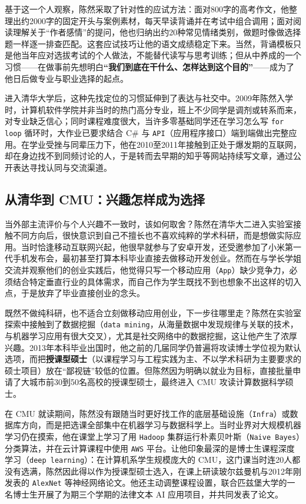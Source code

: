 \documentclass[UTF8,a4paper,11pt,fontset=fandol]{ctexart}
\begin{document}
基于这一个人观察，陈然采取了针对性的应试方法：面对800字的高考作文，他整理出约2000字的固定开头与案例素材，每天早读背诵并在考试中组合调用；面对阅读理解关于“作者感情”的提问，他也归纳出约20种常见情绪类别，做题时像做选择题一样逐一排查匹配。这套应试技巧让他的语文成绩稳定下来。当然，背诵模板只是他当年应对选拔考试的个人做法，不能替代读写与思考训练；但从中养成的一个习惯——在做事前先想明白\textbf{“我们到底在干什么、怎样达到这个目的”}——成为了他日后做专业与职业选择的起点。

进入清华大学后，这种先找定位的习惯延伸到了表达与社交中。2009年陈然入学时，计算机软件学院并非当时的热门高分专业，班上不少同学是调剂或转系而来，对专业缺乏信心；同时课程难度很大，当许多零基础同学还在学习怎么写 \texttt{for loop} 循环时，大作业已要求结合 C\# 与 \texttt{API}（应用程序接口）端到端做出完整应用。在学业受挫与同辈压力下，他在2010至2011年接触到正处于爆发期的互联网，却在身边找不到同频讨论的人，于是转而去早期的知乎等网站持续写文章，通过公开表达寻找认同与交流渠道。

\subsection{从清华到 CMU：兴趣怎样成为选择}
当外部主流评价与个人兴趣不一致时，该如何取舍？陈然在清华大二进入实验室接触不同方向后，很快意识到自己不擅长也不喜欢纯粹的学术科研，而是想做实际应用。当时恰逢移动互联网兴起，他很早就参与了安卓开发，还受邀参加了小米第一代手机发布会，最初甚至打算本科毕业直接去做移动开发创业。然而在与学长学姐交流并观察他们的创业实践后，他觉得只写一个移动应用（\texttt{App}）缺少竞争力，必须结合特定垂直行业的具体需求，而自己作为学生既找不到也想象不出这样的切入点，于是放弃了毕业直接创业的念头。

既然不做纯科研，也不适合立刻做移动应用创业，下一步往哪里走？陈然在实验室探索中接触到了数据挖掘（\texttt{data mining}，从海量数据中发现规律与关联的技术，与机器学习应用有很大交叉），尤其是社交网络中的数据挖掘，这让他产生了浓厚兴趣。2013年本科毕业出国时，他之前的几届同学仍普遍将攻读博士学位视为默认选项，而把\textbf{授课型硕士}（以课程学习与工程实践为主、不以学术科研为主要要求的硕士项目）放在“鄙视链”较低的位置。但陈然因为明确以就业为目标，直接批量申请了大城市前30到50名高校的授课型硕士，最终进入 CMU 攻读计算数据科学硕士。

在 CMU 就读期间，陈然没有跟随当时更好找工作的底层基础设施（\texttt{Infra}）或数据库方向，而是把选课全部集中在机器学习与数据科学上。当时业界对大规模机器学习仍在摸索，他在课堂上学习了用 \texttt{Hadoop} 集群运行朴素贝叶斯（\texttt{Naive Bayes}）分类算法，并在云计算课程中使用 \texttt{AWS} 平台。让他印象最深的是博士生课程深度学习（\texttt{deep learning}）：在计算机系学生规模庞大的 CMU，这门课当时连20人都没有选满，陈然因此得以作为授课型硕士选入，在课上研读玻尔兹曼机与2012年刚发表的 \texttt{AlexNet} 等神经网络论文。他还主动调整课程设置，联合匹兹堡大学的一名博士生开展了为期三个学期的法律文本 AI 应用项目，并共同发表了论文。
\end{document}
